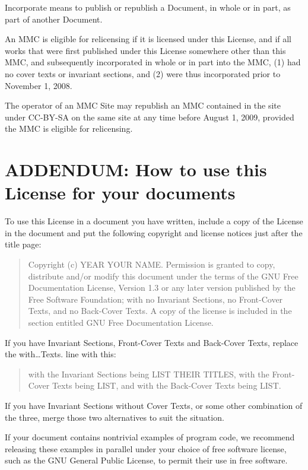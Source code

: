 \documentclass[captions=tableheading]{scrbook}
\begin{document}
Incorporate means to publish or republish a Document, in whole or in part, as part of another Document.

An MMC is eligible for relicensing if it is licensed under this License, and if all works that were first published under this License somewhere other than this MMC, and subsequently incorporated in whole or in part into the MMC, (1) had no cover texts or invariant sections, and (2) were thus incorporated prior to November 1, 2008.

The operator of an MMC Site may republish an MMC contained in the site under CC-BY-SA on the same site at any time before August 1, 2009, provided the MMC is eligible for relicensing.
\section{ADDENDUM: How to use this License for your documents}
\label{sec-3-13}


To use this License in a document you have written, include a copy of the License in the document and put the following copyright and license notices just after the title page: 

\begin{quote}
\noindent Copyright (c) YEAR YOUR NAME. Permission is granted to copy, distribute and/or modify this document under the terms of the GNU Free Documentation License, Version 1.3 or any later version published by the Free Software Foundation; with no Invariant Sections, no Front-Cover Texts, and no Back-Cover Texts. A copy of the license is included in the section entitled GNU Free Documentation License.
\end{quote}

If you have Invariant Sections, Front-Cover Texts and Back-Cover Texts, replace the with\ldots{}Texts. line with this:

\begin{quote}
\noindent with the Invariant Sections being LIST THEIR TITLES, with the Front-Cover Texts being LIST, and with the Back-Cover Texts being LIST.
\end{quote}

If you have Invariant Sections without Cover Texts, or some other combination of the three, merge those two alternatives to suit the situation.

If your document contains nontrivial examples of program code, we recommend releasing these examples in parallel under your choice of free software license, such as the GNU General Public License, to permit their use in free software. 
\end{document}
